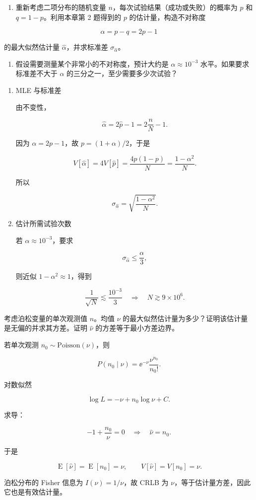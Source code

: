 \begin{question}
\begin{enumerate}
\item
  重新考虑二项分布的随机变量 \(n\)，每次试验结果（成功或失败）的概率为
  \(p\) 和 \(q=1-p\)。利用本章第 2 题得到的 \(p\) 的估计量，构造不对称度
\end{enumerate}

\[
\alpha=p-q=2p-1
\]

的最大似然估计量 \(\hat\alpha\)，并求标准差 \(\sigma_{\hat\alpha}\)。

\begin{enumerate}[start=2]
\item
  假设需要测量某个非常小的不对称度，预计大约是 \(\alpha\approx10^{-3}\)
  水平。如果要求标准差不大于 \(\alpha\) 的三分之一，至少需要多少次试验？
\end{enumerate}
\begin{solution}
\begin{enumerate}
\item MLE 与标准差

由不变性，

\[
\hat\alpha=2\hat p-1=2\frac nN-1.
\]

因为 \(\alpha=2p-1\)，故 \(p=(1+\alpha)/2\)，于是

\[
V[\hat\alpha]=4V[\hat p]=\frac{4p(1-p)}{N}=\frac{1-\alpha^2}{N}.
\]

所以

\[
\sigma_{\hat\alpha}=\sqrt{\frac{1-\alpha^2}{N}}.
\]

\item 估计所需试验次数

若 \(\alpha\approx10^{-3}\)，要求

\[
\sigma_{\hat\alpha}\le \frac\alpha3,
\]

则近似 \(1-\alpha^2\approx1\)，得到

\[
\frac1{\sqrt N}\lesssim\frac{10^{-3}}3
\quad\Rightarrow\quad
N\gtrsim9\times10^6.
\]
\end{enumerate}
\end{solution}
\end{question}


\begin{question}
考虑泊松变量的单次观测值 \(n\)。均值 \(\nu\)
的最大似然估计量为多少？证明该估计量是无偏的并求其方差。证明 \(\hat\nu\)
的方差等于最小方差边界。
\begin{solution}
若单次观测 \(n_0\sim\mathrm{Poisson}(\nu)\)，则

\[
P(n_0\mid\nu)=\ee^{-\nu}\frac{\nu^{n_0}}{n_0!}.
\]

对数似然

\[
\log L=-\nu+n_0\log\nu+C.
\]

求导：

\[
-1+\frac{n_0}{\nu}=0
\quad\Rightarrow\quad
\hat\nu=n_0.
\]

于是

\[
\operatorname{E}[\hat\nu]=\operatorname{E}[n_0]=\nu,
\qquad
V[\hat\nu]=V[n_0]=\nu.
\]

泊松分布的 Fisher 信息为 \(I(\nu)=1/\nu\)，故 CRLB 为
\(\nu\)，等于估计量方差，因此它也是有效估计量。
\end{solution}
\end{question}


